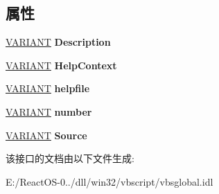 \subsection*{属性}
\begin{DoxyCompactItemize}
\item 
\mbox{\label{interface_v_b_script___global_1_1_err_obj_a9bc2a519ea3d76e1573082a32457af46}} 
\hyperlink{structtag_v_a_r_i_a_n_t}{V\+A\+R\+I\+A\+NT} {\bfseries Description}
\item 
\mbox{\label{interface_v_b_script___global_1_1_err_obj_abebd6a7410aeb0314f92029e5bd1071e}} 
\hyperlink{structtag_v_a_r_i_a_n_t}{V\+A\+R\+I\+A\+NT} {\bfseries Help\+Context}
\item 
\mbox{\label{interface_v_b_script___global_1_1_err_obj_a2a705483bca6493f4ce99f0d4b7459a1}} 
\hyperlink{structtag_v_a_r_i_a_n_t}{V\+A\+R\+I\+A\+NT} {\bfseries helpfile}
\item 
\mbox{\label{interface_v_b_script___global_1_1_err_obj_a8e1679010e8b3e2a40ae8c12adbf9a0a}} 
\hyperlink{structtag_v_a_r_i_a_n_t}{V\+A\+R\+I\+A\+NT} {\bfseries number}
\item 
\mbox{\label{interface_v_b_script___global_1_1_err_obj_a2d24ab39c393ed6cbe07f6c594799445}} 
\hyperlink{structtag_v_a_r_i_a_n_t}{V\+A\+R\+I\+A\+NT} {\bfseries Source}
\end{DoxyCompactItemize}


该接口的文档由以下文件生成\+:\begin{DoxyCompactItemize}
\item 
E\+:/\+React\+O\+S-\/0../dll/win32/vbscript/vbsglobal.\+idl\end{DoxyCompactItemize}
